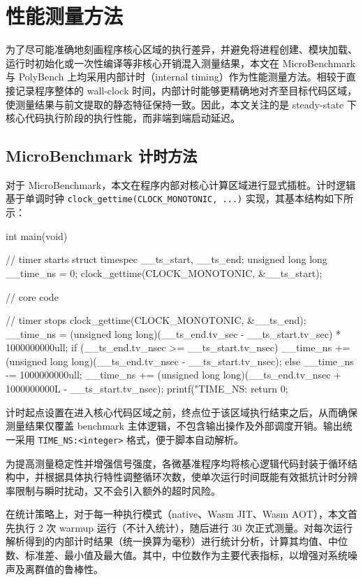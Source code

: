 \section{性能测量方法}

为了尽可能准确地刻画程序核心区域的执行差异，并避免将进程创建、模块加载、运行时初始化或一次性编译等非核心开销混入测量结果，本文在 MicroBenchmark 与 PolyBench 上均采用内部计时（internal timing）作为性能测量方法。相较于直接记录程序整体的 wall-clock 时间，内部计时能够更精确地对齐至目标代码区域，使测量结果与前文提取的静态特征保持一致。因此，本文关注的是 steady-state 下核心代码执行阶段的执行性能，而非端到端启动延迟。

\subsection{MicroBenchmark 计时方法}

对于 MicroBenchmark，本文在程序内部对核心计算区域进行显式插桩。计时逻辑基于单调时钟 \texttt{clock\_gettime(CLOCK\_MONOTONIC, ...)} 实现，其基本结构如下所示：

\begin{cpp}
int main(void) {
    // timer starts
    struct timespec __ts_start, __ts_end;
    unsigned long long __time_ns = 0;
    clock_gettime(CLOCK_MONOTONIC, &__ts_start);
    
    // core code
    
    // timer stops
    clock_gettime(CLOCK_MONOTONIC, &__ts_end);
    __time_ns = (unsigned long long)(__ts_end.tv_sec - __ts_start.tv_sec) * 1000000000ull;
    if (__ts_end.tv_nsec >= __ts_start.tv_nsec) {
        __time_ns += (unsigned long long)(__ts_end.tv_nsec - __ts_start.tv_nsec);
    } else {
        __time_ns -= 1000000000ull;
        __time_ns += (unsigned long long)(__ts_end.tv_nsec + 1000000000L - __ts_start.tv_nsec);
    }
    printf("TIME_NS:%
    return 0;

}
\end{cpp}



计时起点设置在进入核心代码区域之前，终点位于该区域执行结束之后，从而确保测量结果仅覆盖 benchmark 主体逻辑，不包含输出操作及外部调度开销。输出统一采用 \texttt{TIME\_NS:<integer>} 格式，便于脚本自动解析。

为提高测量稳定性并增强信号强度，各微基准程序均将核心逻辑代码封装于循环结构中，并根据具体执行特性调整循环次数，使单次运行时间既能有效抵抗计时分辨率限制与瞬时扰动，又不会引入额外的超时风险。

在统计策略上，对于每一种执行模式（native、Wasm JIT、Wasm AOT），本文首先执行 2 次 warmup 运行（不计入统计），随后进行 30 次正式测量。对每次运行解析得到的内部计时结果（统一换算为毫秒）进行统计分析，计算其均值、中位数、标准差、最小值及最大值。其中，中位数作为主要代表指标，以增强对系统噪声及离群值的鲁棒性。

